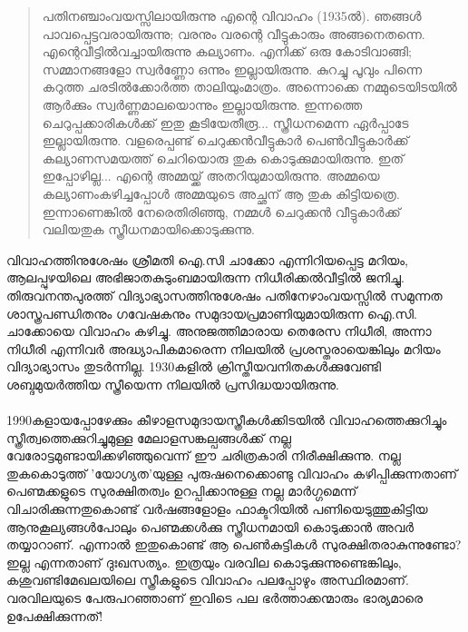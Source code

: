  \begin{quotation}

പതിനഞ്ചാംവയസ്സിലായിരുന്നു എന്റെ വിവാഹം (1935ൽ). ഞങ്ങൾ പാവപ്പെട്ടവരായിരുന്നു; വരനും വരന്റെ വീട്ടുകാരും അങ്ങനെതന്നെ. എന്റെവീട്ടിൽവച്ചായിരുന്നു കല്യാണം. എനിക്ക് ഒരു കോടിവാങ്ങി; സമ്മാനങ്ങളോ സ്വർണ്ണോ ഒന്നും ഇല്ലായിരുന്നു. കുറച്ചു പൂവും പിന്നെ കറുത്ത ചരടിൽക്കോർത്ത താലിയുംമാത്രം. അന്നൊക്കെ നമ്മുടെയിടയിൽ ആർക്കും സ്വർണ്ണമാലയൊന്നും ഇല്ലായിരുന്നു. ഇന്നത്തെ ചെറുപ്പക്കാരികൾക്ക് ഇതു കൂടിയേതീരൂ... സ്ത്രീധനമെന്ന ഏർപ്പാടേ ഇല്ലായിരുന്നു. വളരെപ്പണ്ട് ചെറുക്കൻവീട്ടുകാർ പെൺവീട്ടുകാർക്ക് കല്യാണസമയത്ത് ചെറിയൊരു തുക കൊടുക്കുമായിരുന്നു. ഇത് ഇപ്പോഴില്ല... എന്റെ അമ്മയ്ക്ക് അതറിയുമായിരുന്നു. അമ്മയെ കല്യാണംകഴിച്ചപ്പോൾ അമ്മയുടെ അച്ഛന് ആ തുക കിട്ടിയത്രെ. ഇന്നാണെങ്കിൽ നേരെതിരിഞ്ഞു, നമ്മൾ ചെറുക്കൻ വീട്ടുകാർക്ക് വലിയതുക സ്ത്രീധനമായിക്കൊടുക്കുന്നു.
\end{quotation}
\label{ch5box6} %
\begin{tcolorbox}[%
 breakable, %
  arc=0mm, 
  left=1pt, right = 1pt, 
  boxrule=0mm,
  colback = {blue!10}, %
] 


വിവാഹത്തിനുശേഷം ശ്രീമതി ഐ.സി ചാക്കോ എന്നിറിയപ്പെട്ട മറിയം, ആലപ്പുഴയിലെ അഭിജാതകുടുംബമായിരുന്ന നിധീരിക്കൽവീട്ടിൽ ജനിച്ചു. തിരുവനന്തപുരത്ത് വിദ്യാഭ്യാസത്തിനുശേഷം പതിനേഴാംവയസ്സിൽ സമുന്നത ശാസ്ത്രപണ്ഡിതനും ഗവേഷകനും സമുദായപ്രമാണിയുമായിരുന്ന ഐ.സി. ചാക്കോയെ വിവാഹം കഴിച്ചു. അനുജത്തിമാരായ തെരേസ നിധീരി, അന്നാ നിധീരി എന്നിവർ അദ്ധ്യാപികമാരെന്ന നിലയിൽ പ്രശസ്തരായെങ്കിലും മറിയം വിദ്യാഭ്യാസം തുടർന്നില്ല. 1930കളിൽ ക്രിസ്തീയവനിതകൾക്കുവേണ്ടി ശബ്ദമുയർത്തിയ സ്ത്രീയെന്ന നിലയിൽ പ്രസിദ്ധയായിരുന്നു.

\end{tcolorbox}

\paragraph{}1990കളായപ്പോഴേക്കും കീഴാളസമുദായസ്ത്രീകൾക്കിടയിൽ വിവാഹത്തെക്കുറിച്ചും സ്ത്രീത്വത്തെക്കുറിച്ചുമുള്ള മേലാളസങ്കല്പങ്ങൾക്ക് നല്ല വേരോട്ടമുണ്ടായിക്കഴിഞ്ഞുവെന്ന് ഈ ചരിത്രകാരി നിരീക്ഷിക്കുന്നു. നല്ല തുകകൊടുത്ത് 'യോഗ്യത'യുള്ള പുരുഷനെക്കൊണ്ടു വിവാഹം കഴിപ്പിക്കുന്നതാണ് പെണ്മക്കളുടെ സുരക്ഷിതത്വം ഉറപ്പിക്കാനുള്ള നല്ല മാർഗ്ഗമെന്ന് വിചാരിക്കുന്നതുകൊണ്ട് വർഷങ്ങളോളം ഫാക്ടറിയിൽ പണിയെടുത്തുകിട്ടിയ ആനുകൂല്യങ്ങൾപോലും പെണ്മക്കൾക്കു സ്ത്രീധനമായി കൊടുക്കാൻ അവർ തയ്യാറാണ്. എന്നാൽ ഇതുകൊണ്ട് ആ പെൺകുട്ടികൾ സുരക്ഷിതരാകുന്നുണ്ടോ? ഇല്ല എന്നതാണ് ദുഃഖസത്യം. ഇത്രയും വരവില കൊടുക്കുന്നുണ്ടെങ്കിലും, കശുവണ്ടിമേഖലയിലെ സ്ത്രീകളുടെ വിവാഹം പലപ്പോഴും അസ്ഥിരമാണ്. വരവിലയുടെ പേരുപറഞ്ഞാണ് ഇവിടെ പല ഭർത്താക്കന്മാരും ഭാര്യമാരെ ഉപേക്ഷിക്കുന്നത്!
